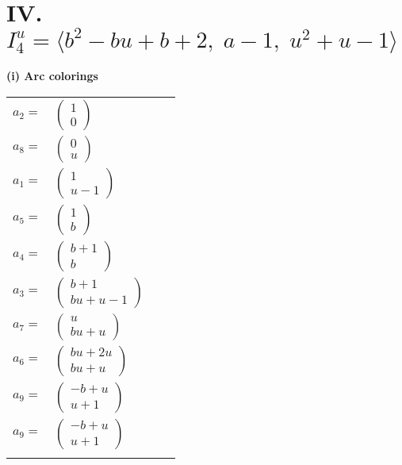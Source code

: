 \documentclass[1p]{elsarticle_modified}
\theoremstyle{definition}
\begin{document}
\centering \section*{IV. $I^u_{4}= \langle b^2- b u+b+2,\;a-1,\;u^2+u-1 \rangle$}
\flushleft \textbf{(i) Arc colorings}\\
\begin{tabular}{m{7pt} m{180pt} m{7pt} m{180pt} }
\flushright $a_{2}=$&$\begin{pmatrix}1\\0\end{pmatrix}$ \\
\flushright $a_{8}=$&$\begin{pmatrix}0\\u\end{pmatrix}$ \\
\flushright $a_{1}=$&$\begin{pmatrix}1\\u-1\end{pmatrix}$ \\
\flushright $a_{5}=$&$\begin{pmatrix}1\\b\end{pmatrix}$ \\
\flushright $a_{4}=$&$\begin{pmatrix}b+1\\b\end{pmatrix}$ \\
\flushright $a_{3}=$&$\begin{pmatrix}b+1\\b u+u-1\end{pmatrix}$ \\
\flushright $a_{7}=$&$\begin{pmatrix}u\\b u+u\end{pmatrix}$ \\
\flushright $a_{6}=$&$\begin{pmatrix}b u+2 u\\b u+u\end{pmatrix}$ \\
\flushright $a_{9}=$&$\begin{pmatrix}- b+u\\u+1\end{pmatrix}$\\ \flushright $a_{9}=$&$\begin{pmatrix}- b+u\\u+1\end{pmatrix}$\\&\end{tabular}
\end{document}
